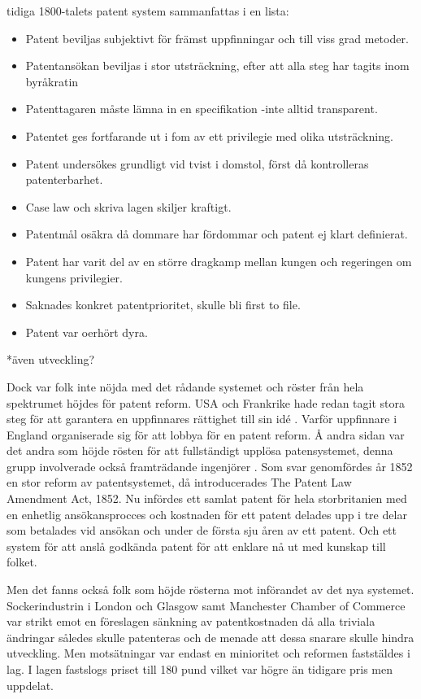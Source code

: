 tidiga 1800-talets patent system sammanfattas i en lista:

\begin{itemize}
	\item Patent beviljas subjektivt för främst uppfinningar och till viss grad metoder.
	\item Patentansökan beviljas i stor utsträckning, efter att alla steg har tagits inom byråkratin
	\item Patenttagaren måste lämna in en specifikation -inte alltid transparent.
	\item Patentet ges fortfarande ut i fom av ett privilegie med olika utsträckning.
	\item Patent undersökes grundligt vid tvist i domstol, först då kontrolleras patenterbarhet.
	\item Case law och skriva lagen skiljer kraftigt.
	\item Patentmål osäkra då dommare har fördommar och patent ej klart definierat.
	\item Patent har varit del av en större dragkamp mellan kungen och regeringen om kungens privilegier. 
	\item Saknades konkret patentprioritet, skulle bli first to file.
	\item Patent var oerhört dyra.
\end{itemize}

*även utveckling? 

Dock var folk inte nöjda med det rådande systemet och röster från hela spektrumet höjdes för patent reform. USA och Frankrike hade redan tagit stora steg för att garantera en uppfinnares rättighet till sin idé \cite{macleod}. Varför uppfinnare i England organiserade sig för att lobbya för en patent reform\cite{dutton}. Å andra sidan var det andra som höjde rösten för att fullständigt upplösa patensystemet, denna grupp involverade också framträdande ingenjörer \cite{macleod}.  
Som svar genomfördes år 1852 en stor reform av patentsystemet, då introducerades The Patent Law Amendment Act, 1852. Nu infördes ett samlat patent för hela storbritanien med en enhetlig ansökansprocces och kostnaden för ett patent delades upp i tre delar som betalades vid ansökan och under de första sju åren av ett patent. Och ett system för att anslå godkända patent för att enklare nå ut med kunskap till folket\cite{dutton}.

Men det fanns också folk som höjde rösterna mot införandet av det nya systemet. Sockerindustrin i London och Glasgow samt Manchester Chamber of Commerce var strikt emot en föreslagen sänkning av patentkostnaden då alla triviala ändringar således skulle patenteras och de menade att dessa snarare skulle hindra utveckling\cite{dutton}. Men motsätningar var endast en minioritet och reformen faststäldes i lag. I lagen fastslogs priset till 180 pund vilket var högre än tidigare pris men uppdelat\cite{dutton}. 

